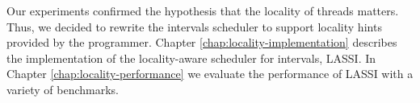 Our experiments confirmed the hypothesis that the locality of threads
matters. Thus, we decided to rewrite the intervals scheduler to
support locality hints provided by the programmer. Chapter
\ref{chap:locality-implementation} describes the implementation of the
locality-aware scheduler for intervals, LASSI. In Chapter
\ref{chap:locality-performance} we evaluate the performance of LASSI
with a variety of benchmarks.


